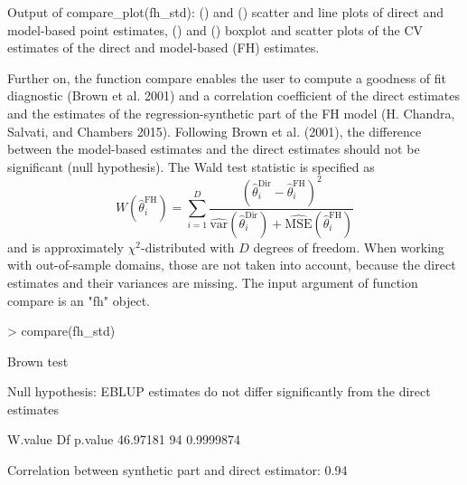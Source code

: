Output of compare\_plot(fh\_std): () and () scatter and line
plots of direct and model-based point estimates, () and () boxplot and
scatter plots of the CV estimates of the direct and model-based (FH)
estimates.

Further on, the function compare enables the user to compute a goodness
of fit diagnostic (Brown et al. 2001) and a correlation coefficient of the
direct estimates and the estimates of the regression-synthetic part of
the FH model (H. Chandra, Salvati, and Chambers 2015). Following Brown et al. (2001), the difference
between the model-based estimates and the direct estimates should not be
significant (null hypothesis). The Wald test statistic is specified as
\[W\left(\hat{\theta}_i^{\text{FH}}\right) = \sum_{i = 1}^{D} \frac{\left(\hat{\theta}_i^{\text{Dir}}-
    \hat{\theta}_i^{\text{FH}}\right)^2}{\widehat{\text{var}}\left(\hat{\theta}_i^{\text{Dir}}\right) + \widehat{\text{MSE}}\left(\hat{\theta}_i^{\text{FH}}\right)}\]
and is approximately \(\chi^2\)-distributed with \(D\) degrees of freedom.
When working with out-of-sample domains, those are not taken into
account, because the direct estimates and their variances are missing.
The input argument of function compare is an "fh" object.

\begin{example}
\textgreater{} compare(fh\_std)

Brown test

Null hypothesis: EBLUP estimates do not differ significantly from the
direct estimates

W.value Df p.value 46.97181 94 0.9999874

Correlation between synthetic part and direct estimator: 0.94
\end{example}

